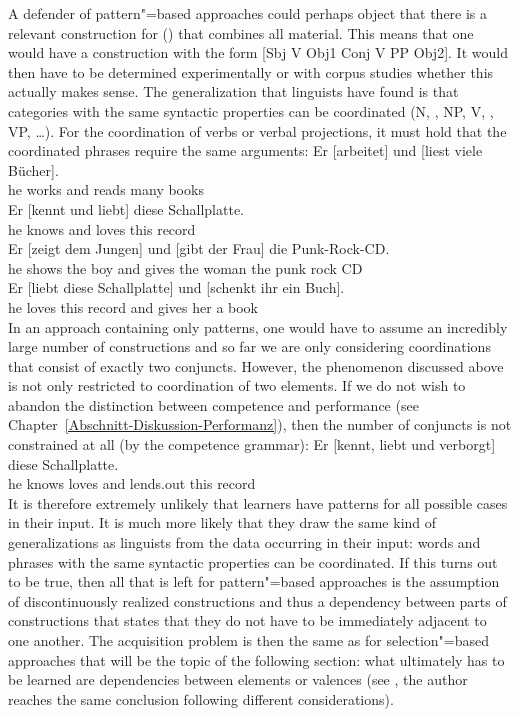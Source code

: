 A defender of pattern"=based approaches could perhaps object that there is a relevant construction for () that combines
all material. This means that one would have a construction with the form [Sbj V Obj1 Conj V PP Obj2].
It would then have to be determined experimentally or with corpus studies whether this actually makes sense.
The generalization that linguists have found is that categories with the same syntactic properties can be coordinated 
(N, \nbar, NP, V, \vbar, VP, \ldots). For the coordination of verbs or verbal projections, it must hold that the coordinated
phrases require the same arguments:
\eal
\ex 
\gll Er [arbeitet] und [liest viele Bücher].\\
     he \spacebr{}works and \spacebr{}reads many books\\
\ex 
\gll Er [kennt und liebt] diese Schallplatte.\\
     he \spacebr{}knows and loves this record\\
\ex 
\gll Er [zeigt dem Jungen] und [gibt der Frau] die Punk-Rock-CD.\\
     he \spacebr{}shows the boy and \spacebr{}gives the woman the {punk rock CD}\\
\ex 
\gll Er [liebt diese Schallplatte] und [schenkt ihr ein Buch].\\
     he \spacebr{}loves this record and \spacebr{}gives her a book\\
\zl
In an approach containing only patterns, one would have to assume an incredibly large number of constructions and so far we are
only considering coordinations that consist of exactly two conjuncts. However, the phenomenon discussed above is not only restricted
to coordination of two elements. If we do not wish to abandon the distinction between competence and performance
(see Chapter~\ref{Abschnitt-Diskussion-Performanz}), then the number of conjuncts is not constrained at all (by the competence grammar):
\ea
\gll Er [kennt, liebt und verborgt] diese Schallplatte.\\
	 he \spacebr{}knows loves and lends.out this record\\
\z
It is therefore extremely unlikely that learners have patterns for all possible cases in their input. It is much more likely that they draw
the same kind of generalizations as linguists from the data occurring in their input: words and phrases with the same syntactic
properties can be coordinated. 
If this turns out to be true, then all that is left for pattern"=based approaches is the assumption of discontinuously realized constructions
and thus a dependency between parts of constructions that states that they do not have to be immediately adjacent to one another.
The acquisition problem is then the same as for selection"=based approaches that will be the topic of the following section: what ultimately has
to be learned are dependencies between elements or valences (see , the author reaches the same conclusion
following different considerations).%
\indexcxgend

